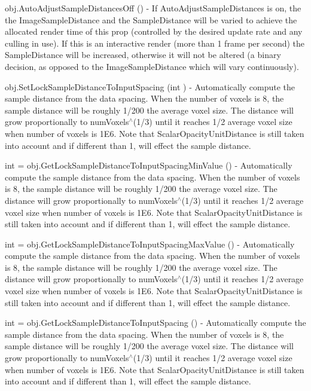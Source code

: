 \begin{DoxyItemize}
\item {\ttfamily obj.\-Auto\-Adjust\-Sample\-Distances\-Off ()} -\/ If Auto\-Adjust\-Sample\-Distances is on, the the Image\-Sample\-Distance and the Sample\-Distance will be varied to achieve the allocated render time of this prop (controlled by the desired update rate and any culling in use). If this is an interactive render (more than 1 frame per second) the Sample\-Distance will be increased, otherwise it will not be altered (a binary decision, as opposed to the Image\-Sample\-Distance which will vary continuously).  
\item {\ttfamily obj.\-Set\-Lock\-Sample\-Distance\-To\-Input\-Spacing (int )} -\/ Automatically compute the sample distance from the data spacing. When the number of voxels is 8, the sample distance will be roughly 1/200 the average voxel size. The distance will grow proportionally to num\-Voxels$^\wedge$(1/3) until it reaches 1/2 average voxel size when number of voxels is 1\-E6. Note that Scalar\-Opacity\-Unit\-Distance is still taken into account and if different than 1, will effect the sample distance.  
\item {\ttfamily int = obj.\-Get\-Lock\-Sample\-Distance\-To\-Input\-Spacing\-Min\-Value ()} -\/ Automatically compute the sample distance from the data spacing. When the number of voxels is 8, the sample distance will be roughly 1/200 the average voxel size. The distance will grow proportionally to num\-Voxels$^\wedge$(1/3) until it reaches 1/2 average voxel size when number of voxels is 1\-E6. Note that Scalar\-Opacity\-Unit\-Distance is still taken into account and if different than 1, will effect the sample distance.  
\item {\ttfamily int = obj.\-Get\-Lock\-Sample\-Distance\-To\-Input\-Spacing\-Max\-Value ()} -\/ Automatically compute the sample distance from the data spacing. When the number of voxels is 8, the sample distance will be roughly 1/200 the average voxel size. The distance will grow proportionally to num\-Voxels$^\wedge$(1/3) until it reaches 1/2 average voxel size when number of voxels is 1\-E6. Note that Scalar\-Opacity\-Unit\-Distance is still taken into account and if different than 1, will effect the sample distance.  
\item {\ttfamily int = obj.\-Get\-Lock\-Sample\-Distance\-To\-Input\-Spacing ()} -\/ Automatically compute the sample distance from the data spacing. When the number of voxels is 8, the sample distance will be roughly 1/200 the average voxel size. The distance will grow proportionally to num\-Voxels$^\wedge$(1/3) until it reaches 1/2 average voxel size when number of voxels is 1\-E6. Note that Scalar\-Opacity\-Unit\-Distance is still taken into account and if different than 1, will effect the sample distance.  

\end{DoxyItemize}

